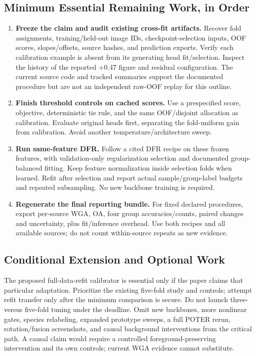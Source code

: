 \documentclass[runningheads]{llncs}
\begin{document}
\subsection{Minimum Essential Remaining Work, in Order}
\begin{enumerate}
\item \textbf{Freeze the claim and audit existing cross-fit artifacts.} Recover fold assignments, training/held-out image IDs, checkpoint-selection inputs, OOF scores, slopes/offsets, source hashes, and prediction exports. Verify each calibration example is absent from its generating head fit/selection. Inspect the history of the reported +0.47 figure and residual configuration. The current source code and tracked summaries support the documented procedure but are not an independent raw-OOF replay for this outline.
\item \textbf{Finish threshold controls on cached scores.} Use a prespecified score, objective, deterministic tie rule, and the same OOF/disjoint allocation as calibration. Evaluate original heads first, separating the fold-uniform gain from calibration. Avoid another temperature/architecture sweep.
\item \textbf{Run same-feature DFR.} Follow a cited DFR recipe on these frozen features, with validation-only regularization selection and documented group-balanced fitting. Keep feature normalization inside selection folds when learned. Refit after selection and report actual sample/group-label budgets and repeated subsampling. No new backbone training is required.
\item \textbf{Regenerate the final reporting bundle.} For fixed declared procedures, export per-source WGA, OA, four group accuracies/counts, paired changes and uncertainty, plus fit/inference overhead. Use both recipes and all available sources; do not count within-source repeats as new evidence.
\end{enumerate}

\subsection{Conditional Extension and Optional Work}
The proposed full-data-refit calibrator is essential only if the paper claims that particular adaptation. Prioritize the existing five-fold study and controls; attempt refit transfer only after the minimum comparison is secure. Do not launch three- versus five-fold tuning under the deadline. Omit new backbones, more nonlinear gates, species relabeling, expanded prototype sweeps, a full POTER rerun, rotation/fusion screenshots, and causal background interventions from the critical path. A causal claim would require a controlled foreground-preserving intervention and its own controls; current WGA evidence cannot substitute.
\end{document}
